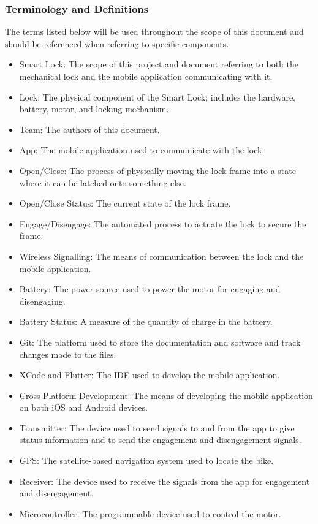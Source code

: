 \documentclass[12pt]{article}
\begin{document}
\subsubsection{Terminology and  Definitions}

The terms listed below will be used throughout the scope of this document and should be referenced when referring to specific components.  

\begin{itemize}
\item Smart Lock: The scope of this project and document referring to both the mechanical lock and the mobile application communicating with it. 
\item Lock: The physical component of the Smart Lock; includes the hardware, battery, motor, and locking mechanism.  
\item Team: The authors of this document.
\item App: The mobile application used to communicate with the lock.
\item Open/Close: The process of physically moving the lock frame into a state where it can be latched onto something else. 
\item Open/Close Status: The current state of the lock frame. 
\item Engage/Disengage: The automated process to actuate the lock to secure the frame. 
\item Wireless Signalling: The means of communication between the lock and the mobile application. 
\item Battery: The power source used to power the motor for engaging and disengaging. 
\item Battery Status: A measure of the quantity of charge in the battery. 
\item Git: The platform used to store the documentation and software and track changes made to the files. 
\item XCode and Flutter: The IDE used to develop the mobile application. 
\item Cross-Platform Development: The means of developing the mobile application on both iOS and Android devices. 
\item Transmitter: The device used to send signals to and from the app to give status information and to send the engagement and disengagement signals. 
\item GPS: The satellite-based navigation system used to locate the bike. 
\item Receiver: The device used to receive the signals from the app for engagement and disengagement. 
\item Microcontroller: The programmable device used to control the motor. 
\end{itemize}
~\newpage
\end{document}
